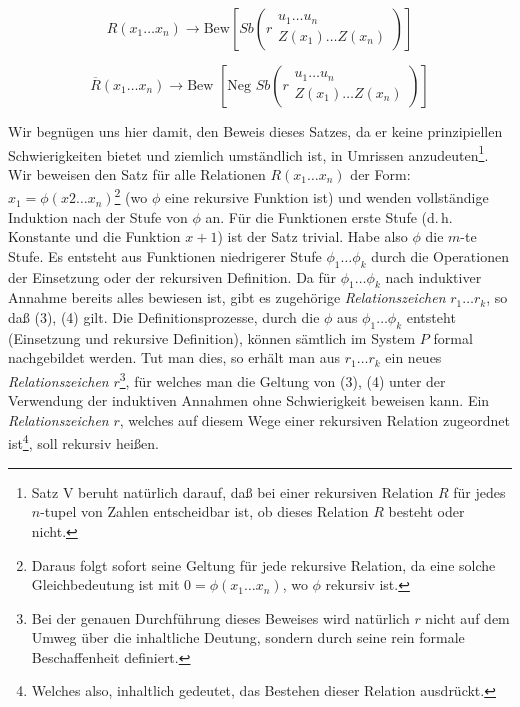 \documentclass[draft]{scrartcl}
\let\oldleft\left
\let\oldright\right
\def\left#1{%
	    \global\advance\bracketnum1\relax 
		\colorlet{temp}{.}%
		    \csname bracketcolor\the\bracketnum\endcsname
			\oldleft#1%
			    \color{temp}%
	}
\def\right#1{%
	    \colorlet{temp}{.}%
		\csname bracketcolor\the\bracketnum\endcsname
		    \oldright#1%
			\global\advance\bracketnum-1\relax
			    \color{temp}%
	}
\def\left#1{#1}
\def\right#1{#1}
\begin{document}
\begin{equation}
	R\left(x_1 \dots x_n\right) \longrightarrow \text{Bew}\left[Sb\left(r\substack{u_1 \dots u_n\\ Z\left(x_1\right) \dots Z\left(x_n\right)}\right)\right]
\end{equation}

\begin{equation}
	\overline{R}\left(x_1 \dots x_n\right) \longrightarrow \text{Bew }\left[\text{Neg } Sb\left(r\substack{u_1 \dots u_n \\ Z\left(x_1\right) \dots Z\left(x_n\right)}\right)\right]
\end{equation}

Wir begnügen uns hier damit, den Beweis dieses Satzes, da er keine prinzipiellen Schwierigkeiten bietet und ziemlich umständlich ist, in Umrissen anzudeuten\footnote{Satz V beruht natürlich darauf, daß bei einer rekursiven Relation $R$ für jedes $n$-tupel von Zahlen  entscheidbar ist, ob dieses Relation $R$ besteht oder nicht.}.
Wir beweisen den Satz für alle Relationen $R\left(x_1 \dots x_n\right)$ der Form: $x_1 = \phi\left(x2 \dots x_n\right)$\footnote{Daraus folgt sofort seine Geltung für jede rekursive Relation, da eine solche Gleichbedeutung ist mit $0 = \phi\left(x_1 \dots x_n\right)$, wo $\phi$ rekursiv ist.}
(wo $\phi$ eine rekursive Funktion ist) und wenden vollständige Induktion nach der Stufe von $\phi$ an. Für die Funktionen erste Stufe (d.\,h. Konstante und die Funktion $x + 1$) ist der Satz trivial. Habe also
$\phi$ die $m$-te Stufe. Es entsteht aus Funktionen niedrigerer Stufe $\phi_1 \dots \phi_k$ durch die Operationen der Einsetzung oder der rekursiven Definition. Da für $\phi_1 \dots \phi_k$ nach induktiver Annahme bereits alles bewiesen ist, gibt es zugehörige \textit{Relationszeichen} $r_1 \dots r_k$, so daß (3), (4) gilt. Die Definitionsprozesse, durch die $\phi$ aus $\phi_1 \dots \phi_k$ entsteht (Einsetzung und rekursive Definition), können sämtlich im System $P$ formal nachgebildet werden. Tut man dies, so erhält man aus $r_1 \dots r_k$ ein neues \textit{Relationszeichen} $r$\footnote{Bei der genauen Durchführung dieses Beweises wird natürlich $r$ nicht auf dem Umweg über die inhaltliche Deutung, sondern durch seine rein formale Beschaffenheit definiert.},
für welches man die Geltung von (3), (4) unter der Verwendung der induktiven Annahmen ohne Schwierigkeit beweisen kann. Ein \textit{Relationszeichen} $r$, welches auf diesem Wege einer rekursiven Relation zugeordnet ist\footnote{Welches also, inhaltlich gedeutet, das Bestehen dieser Relation ausdrückt.},
soll rekursiv heißen.
\end{document}
